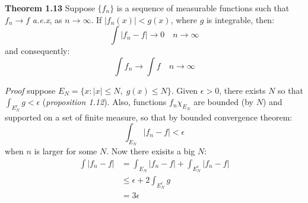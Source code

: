\documentclass[
]{article}
\begin{document}
\textbf{Theorem 1.13} Suppose \(\{f_n\}\) is a sequence of measurable functions such that
\(f_n\to f\) \textit{a.e.x}, as \(n\to \infty\). If \(|f_n(x)|<g(x)\), where \(g\) is integrable,
then:
\[\int |f_n-f|\to 0 \quad n\to \infty\]
and consequently:
\[\int f_n \to \int f \quad n\to \infty\]

\textit{Proof} suppose \(E_N=\{x: |x|\leq N,\; g(x)\leq N\}\). Given \(\epsilon > 0\), there exists
\(N\) so that \(\int_{E_N^\epsilon}g < \epsilon\) (\textit{proposition 1.12}). Also, functions \(f_n\chi_{E_N}\)
are bounded (by \(N\)) and supported on a set of finite measure, so that by bounded convergence theorem:
\[\int_{E_N} |f_n - f| < \epsilon \] when \(n\) is larger for some \(N\). Now there exisits a big \(N\):
\[
  \begin{split}
    \int |f_n-f| &= \int_{E_N} |f_n-f| + \int_{E_N^c} |f_n-f|\\
    &\leq \epsilon + 2\int_{E_N^c}g\\
    &=3\epsilon
  \end{split}
\]
\end{document}
